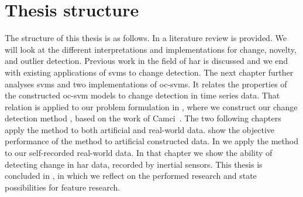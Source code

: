 \section{Thesis structure}
The structure of this thesis is as follows.
In  a literature review is provided.
We will look at the different interpretations and implementations for change, novelty, and outlier detection.
Previous work in the field of \gls{har} is discussed and we end with existing applications of \glspl{svm} to change detection.
The next chapter further analyses \glspl{svm} and two implementations of \glspl{oc-svm}.
It relates the properties of the constructed \gls{oc-svm} models to change detection in time series data.
That relation is applied to our problem formulation in , where we construct our change detection method , based on the work of Camci~\cite{camci2010change}.
The two following chapters apply the method to both artificial and real-world data.
 show the objective performance of the method to artificial constructed data.
In  we apply the method to our self-recorded real-world data.
In that chapter we show the ability of detecting change in \gls{har} data, recorded by inertial sensors.
This thesis is concluded in , in which we reflect on the performed research and state possibilities for feature research.